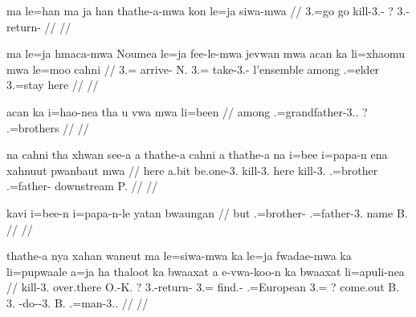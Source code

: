\a\label{ex:thathe3}
\begingl
\gla ma le=han ma ja han thathe-a-mwa kon le=ja siwa-mwa 
// \glb {} 3.=go   go kill-3.- ? 3.- return-
// \glft {}
// \endgl

\a
\begingl
\gla ma le=ja hmaca-mwa Noumea le=ja fee-le-mwa jevwan mwa acan ka li=xhaomu mwa le=moo cahni 
// \glb {} 3.= arrive- N. 3.= take-3.- l'ensemble  among  .=elder  3.=stay here
// \glft {}
// \endgl

\a
\begingl
\gla acan ka i=hao-nea tha u vwa mwa li=been
// \glb among  .=grandfather-3..  ?   .=brothers
// \glft {}
// \endgl

\a
\begingl
\gla na cahni tha xhwan see-a a thathe-a cahni a thathe-a na i=bee i=papa-n ena xahnuut pwanbaut mwa
// \glb {} here  a.bit be.one-3.  kill-3. here  kill-3.  .=brother .=father-  downstream P. 
// \glft {}
// \endgl

\a
\begingl
\gla kavi i=bee-n i=papa-n-le yatan bwaungan
// \glb but .=brother- .=father-3. name B.
// \glft {}
// \endgl


\a
\begingl
\gla thathe-a nya xahan waneut ma le=siwa-mwa ka le=ja fwadae-mwa ka li=pupwaale a=ja ha thaloot ka bwaaxat a e-vwa-koo-n ka bwaaxat li=apuli-nea
// \glb kill-3.  over.there O.-K. ? 3.-return-  3.= find.-  .=European 3.= ? come.out  B. 3. -do--3.  B. .=man-3..
// \glft {}
// \endgl


